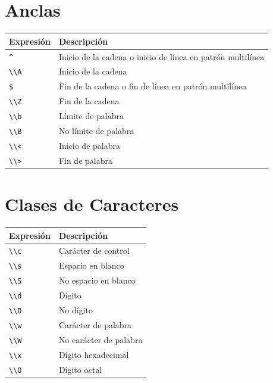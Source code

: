 \documentclass[
  letterpaper,
  DIV=11,
  numbers=noendperiod]{scrreprt}
\begin{document}
\chapter{Anclas}\label{anclas}

\begin{longtable}[]{@{}
  >{\raggedright\arraybackslash}p{}
  >{\raggedright\arraybackslash}p{}@{}}
\toprule\noalign{}
\begin{minipage}[b]{\linewidth}\raggedright
Expresión
\end{minipage} & \begin{minipage}[b]{\linewidth}\raggedright
Descripción
\end{minipage} \\
\midrule\noalign{}
\endhead
\bottomrule\noalign{}
\endlastfoot
\texttt{\^{}} & Inicio de la cadena o inicio de línea en patrón
multilínea \\
\texttt{\textbackslash{}\textbackslash{}A} & Inicio de la cadena \\
\texttt{\$} & Fin de la cadena o fin de línea en patrón multilínea \\
\texttt{\textbackslash{}\textbackslash{}Z} & Fin de la cadena \\
\texttt{\textbackslash{}\textbackslash{}b} & Límite de palabra \\
\texttt{\textbackslash{}\textbackslash{}B} & No límite de palabra \\
\texttt{\textbackslash{}\textbackslash{}\textless{}} & Inicio de
palabra \\
\texttt{\textbackslash{}\textbackslash{}\textgreater{}} & Fin de
palabra \\
\end{longtable}

\chapter{Clases de Caracteres}\label{clases-de-caracteres}

\begin{longtable}[]{@{}ll@{}}
\toprule\noalign{}
Expresión & Descripción \\
\midrule\noalign{}
\endhead
\bottomrule\noalign{}
\endlastfoot
\texttt{\textbackslash{}\textbackslash{}c} & Carácter de control \\
\texttt{\textbackslash{}\textbackslash{}s} & Espacio en blanco \\
\texttt{\textbackslash{}\textbackslash{}S} & No espacio en blanco \\
\texttt{\textbackslash{}\textbackslash{}d} & Dígito \\
\texttt{\textbackslash{}\textbackslash{}D} & No dígito \\
\texttt{\textbackslash{}\textbackslash{}w} & Carácter de palabra \\
\texttt{\textbackslash{}\textbackslash{}W} & No carácter de palabra \\
\texttt{\textbackslash{}\textbackslash{}x} & Dígito hexadecimal \\
\texttt{\textbackslash{}\textbackslash{}O} & Dígito octal \\
\end{longtable}
\end{document}
